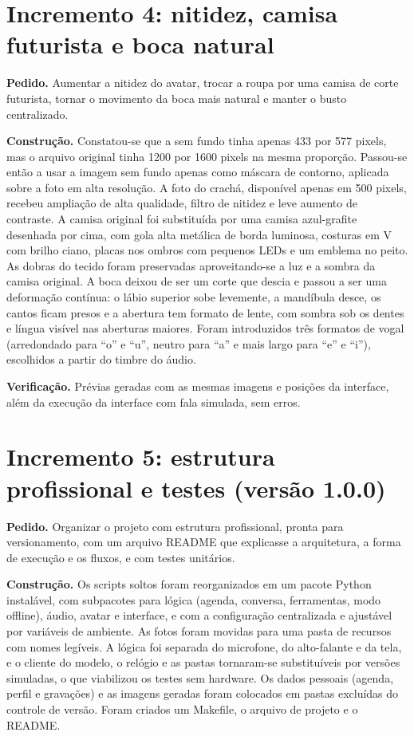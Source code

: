 \section{Incremento 4: nitidez, camisa futurista e boca natural}

\textbf{Pedido.} Aumentar a nitidez do avatar, trocar a roupa por uma camisa de corte futurista, tornar
o movimento da boca mais natural e manter o busto centralizado.

\textbf{Construção.} Constatou-se que a  sem fundo tinha apenas 433 por 577 pixels, mas o
arquivo original tinha 1200 por 1600 pixels na mesma proporção. Passou-se então a usar a imagem sem fundo
apenas como máscara de contorno, aplicada sobre a foto em alta resolução. A foto do crachá, disponível
apenas em 500 pixels, recebeu ampliação de alta qualidade, filtro de nitidez e leve aumento de
contraste. A camisa original foi substituída por uma camisa azul-grafite desenhada por cima, com gola
alta metálica de borda luminosa, costuras em V com brilho ciano, placas nos ombros com pequenos LEDs e
um emblema no peito. As dobras do tecido foram preservadas aproveitando-se a luz e a sombra da camisa
original. A boca deixou de ser um corte que descia e passou a ser uma deformação contínua: o lábio
superior sobe levemente, a mandíbula desce, os cantos ficam presos e a abertura tem formato de lente,
com sombra sob os dentes e língua visível nas aberturas maiores. Foram introduzidos três formatos de
vogal (arredondado para “o” e “u”, neutro para “a” e mais largo para “e” e “i”), escolhidos a partir do
timbre do áudio.

\textbf{Verificação.} Prévias geradas com as mesmas imagens e posições da interface, além da execução
da interface com fala simulada, sem erros.

\section{Incremento 5: estrutura profissional e testes (versão 1.0.0)}

\textbf{Pedido.} Organizar o projeto com estrutura profissional, pronta para versionamento, com um
arquivo README que explicasse a arquitetura, a forma de execução e os fluxos, e com testes unitários.

\textbf{Construção.} Os scripts soltos foram reorganizados em um pacote Python instalável, com
subpacotes para lógica (agenda, conversa, ferramentas, modo offline), áudio, avatar e interface, e com a
configuração centralizada e ajustável por variáveis de ambiente. As fotos foram movidas para uma pasta de
recursos com nomes legíveis. A lógica foi separada do microfone, do alto-falante e da tela, e o cliente
do modelo, o relógio e as pastas tornaram-se substituíveis por versões simuladas, o que viabilizou os
testes sem hardware. Os dados pessoais (agenda, perfil e gravações) e as imagens geradas foram colocados
em pastas excluídas do controle de versão. Foram criados um Makefile, o arquivo de projeto
 e o README.


